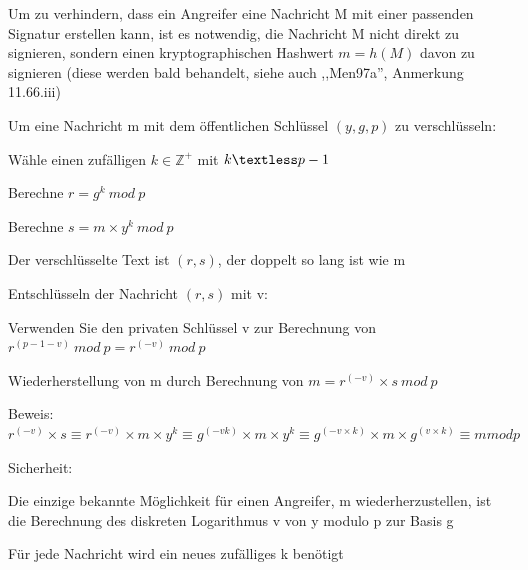 \documentclass[a4paper]{article}
\begin{document}
\begin{multicols}{3}
\begin{itemize*}
\begin{itemize*}
                  \item Um zu verhindern, dass ein Angreifer eine Nachricht M mit einer passenden Signatur erstellen kann, ist es notwendig, die Nachricht M nicht direkt zu signieren, sondern einen kryptographischen Hashwert $m=h(M)$ davon zu signieren (diese werden bald behandelt, siehe auch ,,Men97a'', Anmerkung 11.66.iii)
            \end{itemize*}
            \item Um eine Nachricht m mit dem öffentlichen Schlüssel $(y,g,p)$ zu
            verschlüsseln:
            \begin{itemize*}
                  \item Wähle einen zufälligen $k\in\mathbb{Z}^+$ mit $k\textless p-1$
                  \item Berechne $r=g^k\ mod\ p$
                  \item Berechne $s=m\times y^k\ mod\ p$
                  \item Der verschlüsselte Text ist $(r,s)$, der doppelt so lang ist wie m
            \end{itemize*}
            \item Entschlüsseln der Nachricht $(r,s)$ mit v:
            \begin{itemize*}
                  \item Verwenden Sie den privaten Schlüssel v zur Berechnung von $r^{(p-1-v)}\ mod\ p=r^{(-v)}\ mod\ p$
                  \item Wiederherstellung von m durch Berechnung von $m=r^{(-v)}\times s\ mod\ p$
                  \item Beweis: $r^{(-v)}\times s\equiv r^{(-v)} \times m \times y^k\equiv g^{(-vk)}\times m \times y^k\equiv g^{(-v \times k)} \times m\times g^{(v \times k)} \equiv m mod p$
            \end{itemize*}
            \item Sicherheit:
            \begin{itemize*}
                  \item Die einzige bekannte Möglichkeit für einen Angreifer, m wiederherzustellen, ist die Berechnung des diskreten Logarithmus v von y modulo p zur Basis g
                  \item Für jede Nachricht wird ein neues zufälliges k benötigt
            \end{itemize*}
      \end{itemize*}


\end{multicols}
\end{document}
